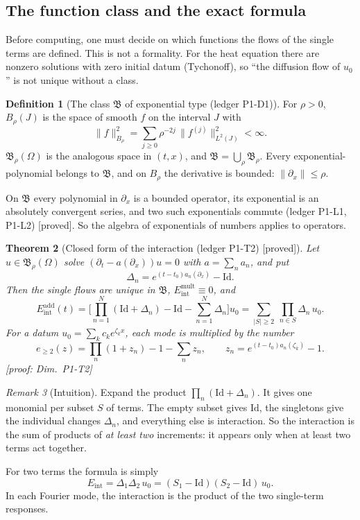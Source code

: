 \documentclass[11pt]{article}
\theoremstyle{plain}
\newtheorem{theorem}{Theorem}[section]
\theoremstyle{definition}
\newtheorem{definition}[theorem]{Definition}
\theoremstyle{remark}
\newtheorem{remark}[theorem]{Remark}
\newcommand{\Id}{\mathrm{Id}}
\newcommand{\Eint}{E_{\mathrm{int}}}        %
\newcommand{\badge}[2]{\textcolor{#1}{\textsf{\footnotesize[#2]}}}
\newcommand{\proved}[1][]{\badge{cC}{proved#1}}
\newcommand{\led}[1]{\textcolor{cG}{\textsf{\footnotesize(ledger #1)}}}
\newenvironment{intuition}{\begin{remark}[Intuition]}{\end{remark}}
\newcommand{\dimref}[1]{\textsf{\footnotesize[proof: Dim.~#1]}}
\newcommand{\Bclass}{\mathfrak{B}}
\begin{document}
\subsection{The function class and the exact formula}

Before computing, one must decide on which functions the flows of the single terms are defined. This is not a formality. For the heat equation there are nonzero solutions with zero initial datum (Tychonoff), so ``the diffusion flow of $u_0$'' is not unique without a class.

\begin{definition}[{The class $\Bclass$ of exponential type \led{P1-D1}}]\label{def:B}
For $\rho>0$, $B_\rho(J)$ is the space of smooth $f$ on the interval $J$ with
\[
\|f\|_{B_\rho}^2=\sum_{j\ge0}\rho^{-2j}\,\|f^{(j)}\|_{L^2(J)}^2<\infty .
\]
$\Bclass_\rho(\Omega)$ is the analogous space in $(t,x)$, and $\Bclass=\bigcup_\rho\Bclass_\rho$. Every exponential-polynomial belongs to $\Bclass$, and on $B_\rho$ the derivative is bounded: $\|\partial_x\|\le\rho$.
\end{definition}

On $\Bclass$ every polynomial in $\partial_x$ is a bounded operator, its exponential is an absolutely convergent series, and two such exponentials commute \led{P1-L1, P1-L2} \proved. So the algebra of exponentials of numbers applies to operators.

\begin{theorem}[{Closed form of the interaction \led{P1-T2} \proved}]\label{f:thm:eint}
Let $u\in\Bclass_\rho(\Omega)$ solve $(\partial_t-a(\partial_x))u=0$ with $a=\sum_na_n$, and put
\[
\Delta_n=e^{(t-t_0)a_n(\partial_x)}-\Id .
\]
Then the single flows are unique in $\Bclass$, $\Eint^{\mathrm{mult}}\equiv0$, and
\begin{equation}\label{f:eq:eint}
\Eint^{\mathrm{add}}(t)=\Big[\prod_{n=1}^N(\Id+\Delta_n)-\Id-\sum_{n=1}^N\Delta_n\Big]u_0
=\sum_{|S|\ge2}\ \prod_{n\in S}\Delta_n\,u_0 .
\end{equation}
For a datum $u_0=\sum_kc_ke^{\zeta_kx}$, each mode is multiplied by the number
\[
e_{\ge2}(z)=\prod_n(1+z_n)-1-\sum_nz_n,\qquad z_n=e^{(t-t_0)a_n(\zeta_k)}-1 .
\]
\dimref{P1-T2}
\end{theorem}

\begin{intuition}
Expand the product $\prod_n(\Id+\Delta_n)$. It gives one monomial per subset $S$ of terms. The empty subset gives $\Id$, the singletons give the individual changes $\Delta_n$, and everything else is interaction. So the interaction is the sum of products of \emph{at least two} increments: it appears only when at least two terms act together.

For two terms the formula is simply
\[
\Eint=\Delta_1\Delta_2\,u_0=(S_1-\Id)(S_2-\Id)\,u_0 .
\]
In each Fourier mode, the interaction is the product of the two single-term responses.
\end{intuition}
\end{document}

